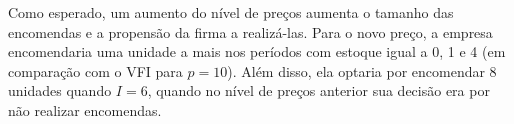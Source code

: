 \documentclass{article}
\begin{document}
Como esperado, um aumento do nível de preços aumenta o tamanho das encomendas e a propensão da firma a realizá-las. Para o novo preço, a empresa encomendaria uma unidade a mais nos períodos com estoque igual a 0, 1 e 4 (em comparação com o VFI para $p=10$). Além disso, ela optaria por encomendar 8 unidades quando $I=6$, quando no nível de preços anterior sua decisão era por não realizar encomendas.

%
%
\end{document}
